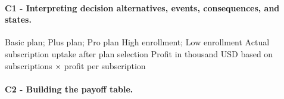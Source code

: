 \paragraph*{C1 - Interpreting decision alternatives, events, consequences, and states.}
	\label{subsec:problem7-rural-internet-subscriptions-c1}
	\DecisionElementsTable
	{Basic plan; Plus plan; Pro plan}
	{High enrollment; Low enrollment}
	{Actual subscription uptake after plan selection}
	{Profit in thousand USD based on subscriptions $\times$ profit per subscription}


	\par\noindent\begin{minipage}{\linewidth}
\paragraph*{C2 - Building the payoff table.}
	\label{subsec:problem7-rural-internet-subscriptions-c2}
\leavevmode\par


\end{minipage}
